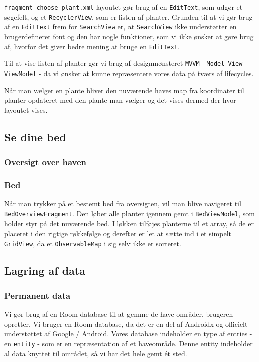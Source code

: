 \texttt{fragment\_choose\_plant.xml} layoutet gør brug af en \texttt{EditText}, som udgør et søgefelt, og et \texttt{RecyclerView}, som er listen af planter.
Grunden til at vi gør brug af en \texttt{EditText} frem for \texttt{SearchView} er, at \texttt{SearchView} ikke understøtter en brugerdefineret font og den har nogle funktioner, som vi ikke ønsker at gøre brug af, hvorfor det giver bedre mening at bruge en \texttt{EditText}.

Til at vise listen af planter gør vi brug af designmønsteret \texttt{MVVM} - \texttt{Model View ViewModel} - da vi ønsker at kunne repræsentere vores data på tværs af lifecycles.

Når man vælger en plante bliver den nuværende haves map fra koordinater til planter opdateret med den plante man vælger og det vises dermed der hvor layoutet vises.

\subsection{Se dine bed}

\subsubsection{Oversigt over haven}

\subsubsection{Bed}
Når man trykker på et bestemt bed fra oversigten, vil man blive navigeret til \texttt{BedOverviewFragment}. Den løber alle planter igennem gemt i \texttt{BedViewModel}, som holder styr på det nuværende bed. I løkken tilføjes planterne til et array, så de er placeret i den rigtige røkkefølge og derefter er let at sætte ind i et simpelt \texttt{GridView}, da et \texttt{ObservableMap} i sig selv ikke er sorteret.

\subsection{Lagring af data}

\subsubsection{Permanent data}
Vi gør brug af en Room-database til at gemme de have-områder, brugeren opretter. Vi bruger en Room-database, da det er en del af Androidx og officielt understøttet af Google / Android. Vores database indeholder en type af entries - en \texttt{entity} - som er en repræsentation af et haveområde. Denne entity indeholder al data knyttet til området, så vi har det hele gemt ét sted.

